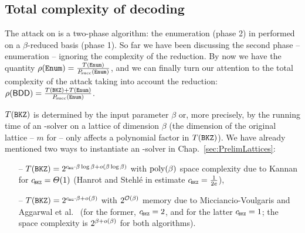 \subsection{Total complexity of \LWE decoding} \label{sec:Balance}

The \BDD attack on \LWE is a two-phase algorithm: the enumeration (phase 2) in performed on a $\beta$-\BKZ reduced basis (phase 1). So far we have been discussing the second phase -- enumeration -- ignoring the complexity of the reduction. By now we have the quantity $\rho(\texttt{Enum}) = \frac{T(\texttt{Enum})}{P\mkern-4mu_{\mbox{\tiny succ}}(\texttt{Enum})}$, and we can finally turn our attention to the total complexity of the attack taking into account the reduction: $\rho(\textsf{BDD}) = \frac{T(\texttt{BKZ})+T(\texttt{Enum})}{P\mkern-4mu_{\mbox{\tiny succ}}(\texttt{Enum})}$.

$T(\texttt{BKZ})$ is determined by the input parameter $\beta$ or, more precisely, by the running time of an \SVP-solver on a lattice of dimension $\beta$ (the dimension of the original lattice -- $m$ for \LWE -- only affects a polynomial factor in $T(\texttt{BKZ})$). We have already mentioned two ways to instantiate an \SVP-solver in Chap.~\ref{sec:PrelimLattices}:
	\begin{itemize}
		\item[--] $T(\BKZ) = 2^{\cBKZ \cdot \beta \log \beta + \smallo(\beta \log \beta) }$ with $\mathrm{poly}(\beta)$ space complexity due to Kannan \cite{STOC:Kannan83} for $\cBKZ = \TLandau(1)$ (Hanrot and Stehl\'{e} in \cite{C:HanSte07} estimate $\cBKZ = \tfrac{1}{2e}$),
		\item[--] $T(\BKZ) = 2^{\cBKZ \cdot \beta  + \smallo(\beta)}$ with $2^{\mathcal{O}(\beta)}$ memory due to Micciancio-Voulgaris \cite{STOC:MicVou10} and Aggarwal et al.\ \cite{STOC:ADRS15} (for the former, $\cBKZ = 2$, and for the latter $\cBKZ = 1$; the space complexity is $2^{\beta + o(\beta)}$ for both algorithms).
	\end{itemize}  
	
